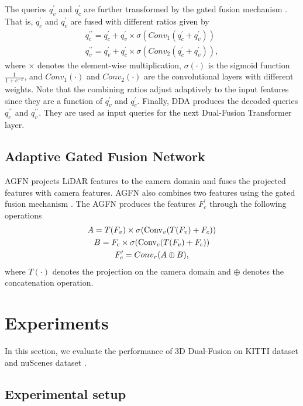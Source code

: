 \documentclass[lettersize,journal]{IEEEtran}
\begin{document}
The queries $q^\prime_v$ and $q^\prime_c$ are further transformed by the gated fusion mechanism \cite{gatedfusion}. That is, $q^\prime_c$ and $q^\prime_v$ are fused with different ratios given by 
\begin{gather}
q^{\prime\prime}_c=q^\prime_c+q^\prime_v\times\sigma({Conv}_1(q^\prime_c+q^\prime_v)) \\
q^{\prime\prime}_v=q^\prime_v+q^\prime_c\times\sigma({Conv}_2(q^\prime_c+q^\prime_v)),
\end{gather}
where $\times$ denotes the element-wise multiplication,  $\sigma(\cdot)$ is the sigmoid function $\frac{1}{1+e^{-x}}$, and ${Conv}_1(\cdot)$ and ${Conv}_2(\cdot)$ are the convolutional layers with different weights. Note that the combining ratios adjust adaptively to the input features since they are a function of $q^\prime_v$ and $q^\prime_c$.  Finally, DDA produces the decoded queries $q^{\prime\prime}_c$ and $q^{\prime\prime}_v$. They are used as input queries for the next Dual-Fusion Transformer layer. 









\subsection{Adaptive Gated Fusion Network}
 AGFN projects LiDAR features to the camera domain and fuses the projected features with camera features. AGFN also combines two features using the gated fusion mechanism \cite{gatedfusion}.  The AGFN produces the features $F^\prime_c$ through the following operations
\begin{gather}
A=T(F_v)\times\sigma({\rm Conv}_v(T(F_v)+F_c))\\
B=F_c\times\sigma({\rm Conv}_c(T(F_v)+F_c))\\
F^\prime_c={Conv}_r(A \oplus B ),
\end{gather}
where $T( \cdot)$ denotes the projection on the camera domain and $\oplus$ denotes the concatenation operation.  




\section{Experiments} 
\label{Experiments}
In this section, we evaluate the performance of 3D Dual-Fusion on  KITTI dataset \cite{kitti} and  nuScenes dataset \cite{nuscenes}. 
\subsection{Experimental setup}
\end{document}
